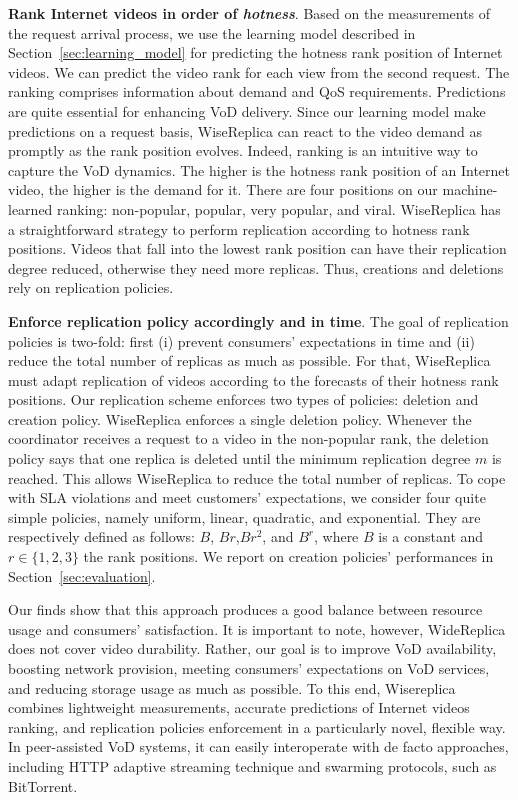 \noindent
\textbf{Rank Internet videos in order of \emph{hotness}}. Based on the measurements of the request arrival process, we use the learning model described in Section~\ref{sec:learning_model} for predicting the hotness rank position of Internet videos. We can predict the video rank for each view from the second request. The ranking comprises information about demand and QoS requirements. Predictions are quite essential for enhancing VoD delivery. Since our learning model make predictions on a request basis, WiseReplica can react to the video demand as promptly as the rank position evolves. Indeed, ranking is an intuitive way to capture the VoD dynamics. The higher is the hotness rank position of an Internet video, the higher is the demand for it. There are four positions on our machine-learned ranking: non-popular, popular, very popular, and viral. WiseReplica has a straightforward strategy to perform replication according to hotness rank positions. Videos that fall into the lowest rank position can have their replication degree reduced, otherwise they need more replicas. Thus, creations and deletions rely on replication policies.

\noindent
\textbf{Enforce replication policy accordingly and in time}. The goal of replication policies is two-fold: first (i) prevent consumers' expectations in time and (ii) reduce the total number of replicas as much as possible. For that, WiseReplica must adapt replication of videos according to the forecasts of their hotness rank positions. Our replication scheme enforces two types of policies: deletion and creation policy. WiseReplica enforces a single deletion policy.  Whenever the coordinator receives a request to a video in the non-popular rank, the deletion policy says that one replica is deleted until the minimum replication degree $m$ is reached. This allows WiseReplica to reduce the total number of replicas. To cope with SLA violations and meet customers' expectations, we consider four quite simple policies, namely uniform, linear, quadratic, and exponential. They are respectively defined as follows: $B$, $Br$,$Br^2$, and $B^r$, where $B$ is a constant and $r \in \{1,2,3\}$ the rank positions. We report on creation policies' performances in Section~\ref{sec:evaluation}.


Our finds show that this approach produces a good balance between resource usage and consumers' satisfaction. It is important to note, however, WideReplica does not cover video durability. Rather, our goal is to improve VoD availability, boosting network provision, meeting consumers' expectations on VoD services, and reducing storage usage as much as possible. To this end, Wisereplica combines lightweight measurements, accurate predictions of Internet videos ranking, and replication policies enforcement in a particularly novel, flexible way. In peer-assisted VoD systems, it can easily interoperate with de facto approaches, including HTTP adaptive streaming technique and swarming protocols, such as BitTorrent. 
